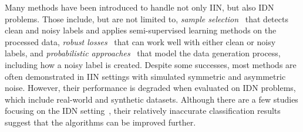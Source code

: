 \documentclass[10pt,twocolumn,letterpaper]{article}
\begin{document}
    Many methods have been introduced to handle not only IIN, but also IDN problems. Those include, but are not limited to, \emph{sample selection}~\cite{xia2021sample, li2020dividemix, zheltonozhskii2022contrast,kim2021fine, cordeiro2021propmix} that detects clean and noisy labels and applies semi-supervised learning methods on the processed data, \emph{robust losses}~\cite{patrini2017making, arazo2019unsupervised, liu2020peer} that can work well with either clean or noisy labels, and \emph{probabilistic approaches}~\cite{yao2021instance} that model the data generation process, including how a noisy label is created. 
    Despite some successes, most methods are often demonstrated in IIN settings with simulated symmetric and asymmetric noise. However, their performance is degraded when evaluated on IDN problems, which include real-world and synthetic datasets. Although there are a few studies focusing on the IDN setting~\cite{yao2021instance, cheng2022instance, xia2020part,zhu2021clusterability, jiang2021information}, their relatively inaccurate classification results suggest that the algorithms can be improved further.
    
    
\end{document}
